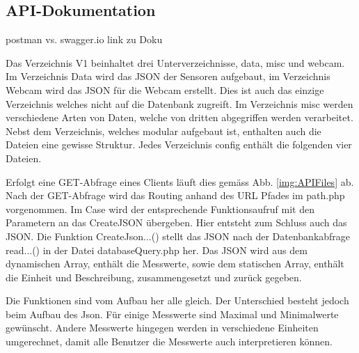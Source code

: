 \subsection{API-Dokumentation}
postman vs. swagger.io
link zu Doku

Das Verzeichnis V1 beinhaltet drei Unterverzeichnisse, data, misc und webcam. Im Verzeichnis Data wird das JSON der Sensoren aufgebaut, im Verzeichnis Webcam wird das JSON für die Webcam erstellt. Dies ist auch das einzige Verzeichnis welches nicht auf die Datenbank zugreift. Im Verzeichnis misc werden verschiedene Arten von Daten, welche von dritten abgegriffen werden verarbeitet. Nebst dem Verzeichnis, welches modular aufgebaut ist, enthalten auch die Dateien eine gewisse Struktur. Jedes Verzeichnis config enthält die folgenden vier Dateien.


Erfolgt eine GET-Abfrage eines Clients läuft dies gemäss Abb. \ref{img:APIFiles}  ab. Nach der GET-Abfrage wird das Routing anhand des URL Pfades im path.php vorgenommen. Im Case wird der entsprechende Funktionsaufruf mit den Parametern an das CreateJSON übergeben. Hier entsteht zum Schluss auch das JSON. Die Funktion CreateJson...() stellt das JSON nach der Datenbankabfrage read...() in der Datei databaseQuery.php her. Das JSON wird aus dem dynamischen Array, enthält die Messwerte, sowie dem statischen Array, enthält die Einheit und Beschreibung, zusammengesetzt und zurück gegeben.

Die Funktionen sind vom Aufbau her alle gleich. Der Unterschied besteht jedoch beim Aufbau des Json. Für einige Messwerte sind Maximal und Minimalwerte gewünscht. Andere Messwerte hingegen werden in verschiedene Einheiten umgerechnet, damit alle Benutzer die Messwerte auch interpretieren können.
